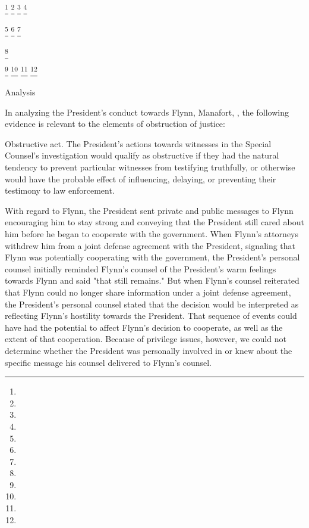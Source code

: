 
\footnote{}
\footnote{}
\footnote{}
\footnote{}

\footnote{}
\footnote{}
\footnote{}

\footnote{}

\footnote{}
\footnote{}
\footnote{}
\footnote{}

Analysis

In analyzing the President's conduct towards Flynn, Manafort, , the following evidence is relevant to the elements of obstruction of justice:

Obstructive act.
The President's actions towards witnesses in the Special Counsel's investigation would qualify as obstructive if they had the natural tendency to prevent particular witnesses from testifying truthfully, or otherwise would have the probable effect of influencing, delaying, or preventing their testimony to law enforcement.

With regard to Flynn, the President sent private and public messages to Flynn encouraging him to stay strong and conveying that the President still cared about him before he began to cooperate with the government.
When Flynn's attorneys withdrew him from a joint defense agreement with the President, signaling that Flynn was potentially cooperating with the government, the President's personal counsel initially reminded Flynn's counsel of the President's warm feelings towards Flynn and said "that still remains."
But when Flynn's counsel reiterated that Flynn could no longer share information under a joint defense agreement, the President's personal counsel stated that the decision would be interpreted as reflecting Flynn's hostility towards the President.
That sequence of events could have had the potential to affect Flynn's decision to cooperate, as well as the extent of that cooperation.
Because of privilege issues, however, we could not determine whether the President was personally involved in or knew about the specific message his counsel delivered to Flynn's counsel.

